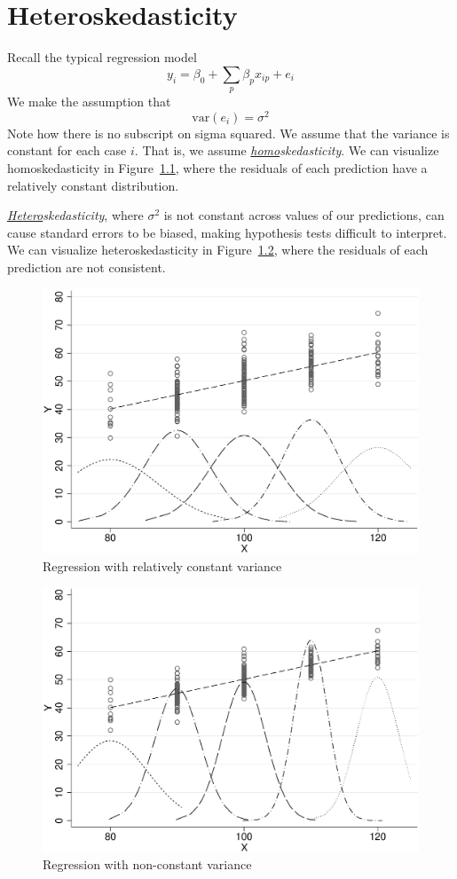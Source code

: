 \chapter{Heteroskedasticity}
\label{sec:het}
Recall the typical regression model
\[
y_i=\beta_0+\sum_p\beta_px_{ip}+e_i
\]
We make the assumption that
\[
\mbox{var}\left(e_i\right)=\sigma^2
\]
Note how there is no subscript on sigma squared. We assume that the variance is constant for each case $i$. That is, we assume {\it \underline{homo}skedasticity}. We can visualize homoskedasticity in Figure~\ref{fig:hetokcurv}, where the residuals of each prediction have a relatively constant distribution.

{\it \underline{Hetero}skedasticity}, where $\sigma^2$ is not constant across values of our predictions, can cause standard errors to be biased, making hypothesis tests difficult to interpret. We can visualize heteroskedasticity in Figure~\ref{fig:hetnotokcurv}, where the residuals of each prediction are not consistent.

\begin{figure}
   \centering
   \includegraphics[angle=0,
           width=.75\textwidth]{hetokcurv.eps}
   \caption{Regression with relatively constant variance}
  \label{fig:hetokcurv}
\end{figure}
\begin{figure}
   \centering
   \includegraphics[angle=0,
           width=.75\textwidth]{hetnotokcurv.eps}
   \caption{Regression with non-constant variance}
  \label{fig:hetnotokcurv}
\end{figure}

